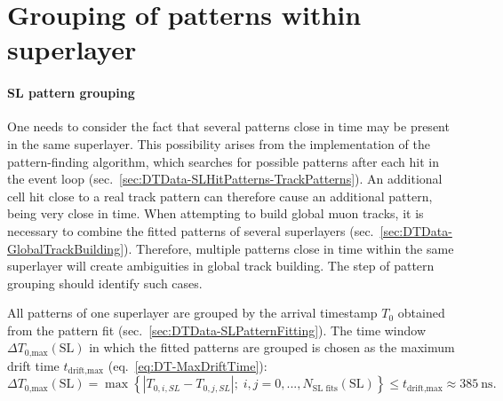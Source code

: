 \FloatBarrier
\section{Grouping of patterns within superlayer}
\label{sec:DTData-SLFitGrouping}
\paragraph{SL pattern grouping}
One needs to consider the fact that several patterns close in time may be present in the same superlayer. This possibility arises from the implementation of the pattern-finding algorithm, which searches for possible patterns after each hit in the event loop (sec.\ \ref{sec:DTData-SLHitPatterns-TrackPatterns}). An additional cell hit close to a real track pattern can therefore cause an additional pattern, being very close in time. When attempting to build global muon tracks, it is necessary to combine the fitted patterns of several superlayers (sec.\ \ref{sec:DTData-GlobalTrackBuilding}). Therefore, multiple patterns close in time within the same superlayer will create ambiguities in global track building. The step of pattern grouping should identify such cases.
\par All patterns of one superlayer are grouped by the arrival timestamp $T_0$ obtained from the pattern fit (sec.\ \ref{sec:DTData-SLPatternFitting}). The time window $\Delta T_\text{0,max}(\text{SL})$ in which the fitted patterns are grouped is chosen as the maximum drift time $t_\text{drift,max}$ (eq.\ \ref{eq:DT-MaxDriftTime}):
\begin{equation}
    \Delta T_\text{0,max}(\text{SL}) = \max \left\{ \left | T_{0,i,SL} - T_{0,j,SL} \right | ; \; i,j=0,...,N_\text{SL fits}(\text{SL}) \right\} \leq t_\text{drift,max} \approx \SI{385}{\nano\second}.
    \label{eq:DTData-SLFitGrouping-TimeWindow}
\end{equation}
